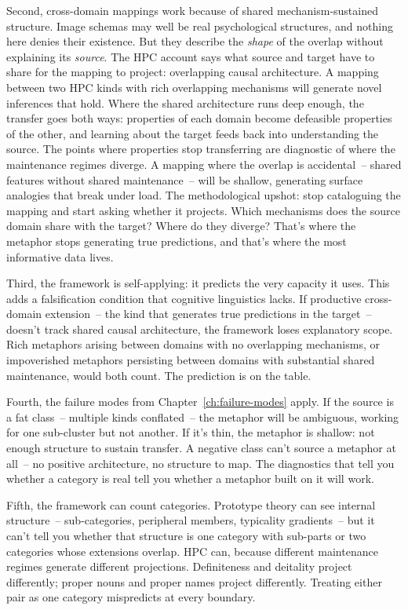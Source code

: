 Second, cross-domain mappings work because of shared mechanism-sustained structure. Image schemas may well be real psychological structures, and nothing here denies their existence. But they describe the \emph{shape} of the overlap without explaining its \emph{source}. The HPC account says what source and target have to share for the mapping to project: overlapping causal architecture. A mapping between two HPC kinds with rich overlapping mechanisms will generate novel inferences that hold. Where the shared architecture runs deep enough, the transfer goes both ways: properties of each domain become defeasible properties of the other, and learning about the target feeds back into understanding the source. The points where properties stop transferring are diagnostic of where the maintenance regimes diverge. A mapping where the overlap is accidental~-- shared features without shared maintenance~-- will be shallow, generating surface analogies that break under load. The methodological upshot: stop cataloguing the mapping and start asking whether it projects. Which mechanisms does the source domain share with the target? Where do they diverge? That's where the metaphor stops generating true predictions, and that's where the most informative data lives.

Third, the framework is self-applying: it predicts the very capacity it uses. This adds a falsification condition that cognitive linguistics lacks. If productive cross-domain extension~-- the kind that generates true predictions in the target~-- doesn't track shared causal architecture, the framework loses explanatory scope. Rich metaphors arising between domains with no overlapping mechanisms, or impoverished metaphors persisting between domains with substantial shared maintenance, would both count. The prediction is on the table.

Fourth, the failure modes from Chapter~\ref{ch:failure-modes} apply. If the source is a fat class~-- multiple kinds conflated~-- the metaphor will be ambiguous, working for one sub-cluster but not another. If it's thin, the metaphor is shallow: not enough structure to sustain transfer. A negative class can't source a metaphor at all~-- no positive architecture, no structure to map. The diagnostics that tell you whether a category is real tell you whether a metaphor built on it will work.

Fifth, the framework can count categories. Prototype theory can see internal structure~-- sub-categories, peripheral members, typicality gradients~-- but it can't tell you whether that structure is one category with sub-parts or two categories whose extensions overlap. HPC can, because different maintenance regimes generate different projections. Definiteness and deitality project differently; proper nouns and proper names project differently. Treating either pair as one category mispredicts at every boundary.

